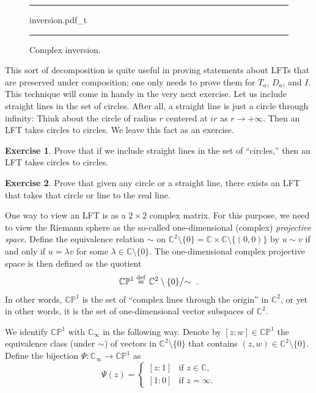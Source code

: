 \documentclass[12pt,openany]{book}
\newcommand{\faktor}[2]{\left.#1\middle/#2\right.}
\newcommand{\glsadd}[2][]{}
\newcommand{\C}{{\mathbb{C}}}
\newcommand{\bP}{{\mathbb{P}}}
\newcommand{\myindex}[1]{#1\index{#1}}
\newcommand{\myquote}[1]{``#1''}
\theoremstyle{plain}
\theoremstyle{remark}
\theoremstyle{definition}
\newenvironment{exbox}{%
    \def\FrameCommand{\vrule width 1pt \relax\hspace{10pt}}%
    \MakeFramed{\advance\hsize-\width\FrameRestore}%
}{%
    \endMakeFramed
}
\newenvironment{myfig}{%
\begin{figure}[h!t]
\noindent\rule{\textwidth}{0.5pt}\vspace{12pt}\par\centering}%
{\par\noindent\rule{\textwidth}{0.5pt}
\end{figure}}
\theoremstyle{exercise}
\newtheorem{exercise}{Exercise}[section]
\theoremstyle{example}
\begin{document}
\begin{myfig}
{inversion.pdf_t}
\caption{Complex inversion.\label{fig:inversion}}
\end{myfig}

This sort of decomposition is quite useful in proving statements about
LFTs that are preserved under composition;
one only needs to prove them for $T_a$, $D_a$, and $I$.  This technique
will come in handy in the very next exercise.
Let us include straight lines in the set of circles.  After all, a straight
line is just a circle through infinity: Think about the circle of radius $r$
centered at $ir$ as $r \to +\infty$.  Then an LFT takes circles to circles.
We leave this fact as an exercise.

\begin{exbox}
\begin{exercise}
Prove that if we include straight lines in the set of \myquote{circles,} then
an LFT takes circles to circles.
\end{exercise}

\begin{exercise} \label{exercise:anycircletorealline}
Prove that given any circle or a straight line, there exists an LFT
that takes that circle or line to the real line.
\end{exercise}
\end{exbox}

One way to view an LFT is as a $2 \times 2$ complex matrix.  For this
purpose,
we need to view the Riemann sphere as the so-called one-dimensional
(complex) \emph{\myindex{projective space}}.
Define the equivalence relation $\sim$ on
$\C^2 \setminus \{ 0 \} = \C \times \C \setminus \{ (0,0) \}$ by
$u \sim v$ if and only if $u = \lambda v$ for some $\lambda \in \C \setminus
\{ 0 \}$.
The one-dimensional complex projective space
is then defined as the quotient
\glsadd{not:CP1}%
\begin{equation*}
\C \bP^1
\overset{\text{def}}{=}
\faktor{\C^2 \setminus \{ 0\}}{\sim} \ .
\end{equation*}
In other words, $\C \bP^1$ is the set of \myquote{complex lines through the
origin} in $\C^2$, or yet in other words,
it is the set of one-dimensional vector
subspaces of $\C^2$.

We identify $\C\bP^1$ with $\C_\infty$ in the following
way.  Denote by
\glsadd{not:CP1pt}%
$[z:w] \in \C \bP^1$
the equivalence class (under $\sim$) of vectors in $\C^2 \setminus \{0\}$
that contains $(z,w) \in \C^2 \setminus \{0\}$.
Define the bijection $\Psi \colon \C_\infty \to \C \bP^1$ as
\begin{equation*}
\Psi(z) =
\begin{cases}
[z:1] & \text{if } z \in \C , \\
[1:0] & \text{if } z=\infty .
\end{cases}
\end{equation*}
\end{document}
